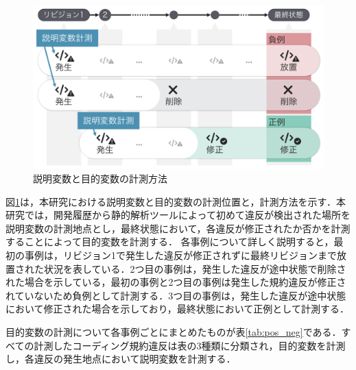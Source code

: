 \documentclass[11pt,dvipdfmx]{jreport}
\begin{document}
\begin{figure}[t]
	\centering
	\includegraphics[width=1.0\linewidth]{Kameoka_fig/kameoka_fig2.pdf}
	\caption{説明変数と目的変数の計測方法}
	\label{fig:mokutekihensu}
\end{figure}

図\ref{fig:mokutekihensu}は，本研究における説明変数と目的変数の計測位置と，計測方法を示す．本研究では，開発履歴から静的解析ツールによって初めて違反が検出された場所を説明変数の計測地点とし，最終状態において，各違反が修正されたか否かを計測することによって目的変数を計測する．
各事例について詳しく説明すると，最初の事例は，リビジョン1で発生した違反が修正されずに最終リビジョンまで放置された状況を表している．2つ目の事例は，発生した違反が途中状態で削除された場合を示している，最初の事例と2つ目の事例は発生した規約違反が修正されていないため負例として計測する．3つ目の事例は，発生した違反が途中状態において修正された場合を示しており，最終状態において正例として計測する．

目的変数の計測について各事例ごとにまとめたものが表\ref{tab:pos_neg}である．すべての計測したコーディング規約違反は表の3種類に分類され，目的変数を計測し，各違反の発生地点において説明変数を計測する．



\end{document}
